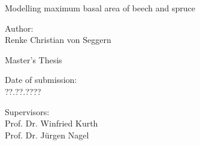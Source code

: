 \begin{titlepage}

\begin{center}

\vspace*{5cm}

{\LARGE Modelling maximum basal area of beech and spruce \\}

\vspace{2cm}

{\large Author: \\ Renke Christian von Seggern \par}

\vspace{2cm}

{\normalsize Master’s Thesis}

\vspace{0.5cm}

{\normalsize Date of submission: \\ ??.??.???? \par}

\vspace{0.5cm}

{\normalsize Supervisors: \\ Prof. Dr. Winfried Kurth \\ Prof. Dr. Jürgen Nagel \par}

\end{center}

\end{titlepage}

